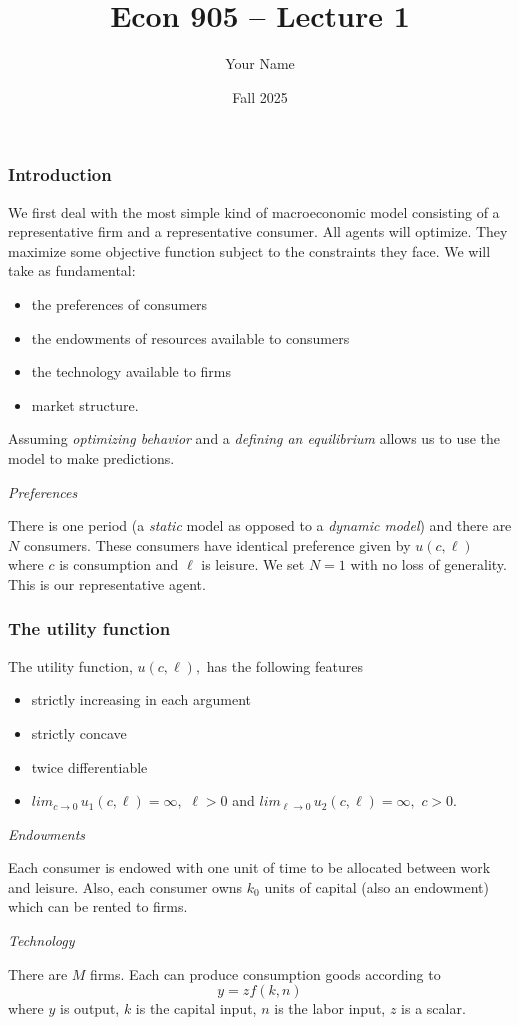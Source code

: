 \documentclass[aspectratio=169]{ltx-talk}
\title{Econ 905 -- Lecture 1}
\author{Your Name}
\institute{Kansas State University}
\date{Fall 2025}
\begin{document}
\begin{frame}
  \titlepage
\end{frame}

\begin{frame}
\frametitle{Introduction}
We first deal with the most simple kind of macroeconomic model consisting of
a representative firm and a representative consumer. All agents will
optimize. They maximize some objective function subject to the constraints
they face. We will take as fundamental:

\begin{itemize}
\item the preferences of consumers

\item the endowments of resources available to consumers

\item the technology available to firms

\item market structure.
\end{itemize}

Assuming \textit{optimizing behavior} and a \textit{defining an equilibrium}
allows us to use the model to make predictions.

\textit{Preferences}

There is one period (a \textit{static} model as opposed to a \textit{dynamic
model}) and there are $N$ consumers. These consumers have identical
preference given by $u(c,\ell )$ where $c$ is consumption and $\ell $ is
leisure. We set $N=1$ with no loss of generality. This is our representative
agent.
\end{frame}

\begin{frame}
\frametitle{The utility function}
The utility function, $u(c,\ell ),$ has the following features

\begin{itemize}
\item strictly increasing in each argument

\item strictly concave

\item twice differentiable

\item $lim_{c\rightarrow 0}\,u_{1}(c,\ell )=\infty ,$ $\ell >0$ and $%
lim_{\ell \rightarrow 0}\,u_{2}(c,\ell )=\infty ,$ $c>0.$
\end{itemize}

\textit{Endowments}

Each consumer is endowed with one unit of time to be allocated between work
and leisure. Also, each consumer owns $k_{0}$ units of capital (also an
endowment) which can be rented to firms.

\textit{Technology}

There are $M$ firms. Each can produce consumption goods according to 
\begin{equation*}
y=zf(k,n)
\end{equation*}%
where $y$ is output, $k$ is the capital input, $n$ is the labor input, $z$
is a scalar.
\end{frame}
\end{document}
